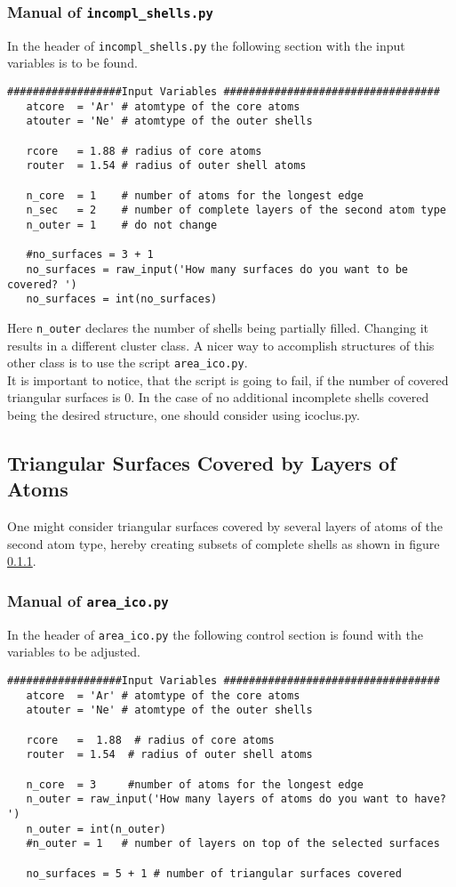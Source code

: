 \subsubsection{Manual of \lstinline|incompl_shells.py|}
In the header of \lstinline|incompl_shells.py| the following section
with the
input variables is to be found.

\begin{lstlisting}
##################Input Variables ##################################
   atcore  = 'Ar' # atomtype of the core atoms
   atouter = 'Ne' # atomtype of the outer shells
   
   rcore   = 1.88 # radius of core atoms
   router  = 1.54 # radius of outer shell atoms
   
   n_core  = 1    # number of atoms for the longest edge
   n_sec   = 2    # number of complete layers of the second atom type
   n_outer = 1    # do not change
   
   #no_surfaces = 3 + 1
   no_surfaces = raw_input('How many surfaces do you want to be covered? ')
   no_surfaces = int(no_surfaces)
\end{lstlisting}
Here \lstinline|n_outer| declares the number of shells being
partially filled. Changing it results in a different cluster class.
A nicer way to accomplish structures of this other class is to use the
script \lstinline|area_ico.py|.\\
It is important to notice, that the script is going to fail,
if the number of covered triangular surfaces is 0. In the case of
no additional incomplete shells covered being the desired structure,
one should consider using icoclus.py.


\subsection{Triangular Surfaces Covered by Layers of Atoms}
One might consider triangular surfaces covered by several layers of
atoms of the second atom type, hereby creating subsets of complete
shells as shown in figure \ref{}.

\subsubsection{Manual of \lstinline|area_ico.py|}
In the header of \lstinline|area_ico.py| the following control section
is found with the variables to be adjusted.

\begin{lstlisting}
##################Input Variables ##################################
   atcore  = 'Ar' # atomtype of the core atoms
   atouter = 'Ne' # atomtype of the outer shells
   
   rcore   =  1.88  # radius of core atoms
   router  = 1.54  # radius of outer shell atoms
   
   n_core  = 3     #number of atoms for the longest edge
   n_outer = raw_input('How many layers of atoms do you want to have? ')
   n_outer = int(n_outer)
   #n_outer = 1   # number of layers on top of the selected surfaces
   
   no_surfaces = 5 + 1 # number of triangular surfaces covered
\end{lstlisting}



